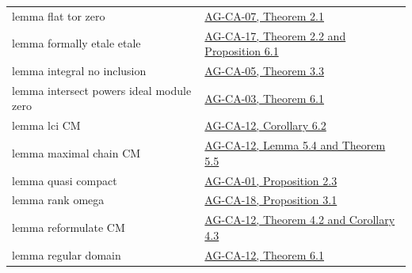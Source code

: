 \documentclass[11pt,a4paper,openany]{report}
\begin{document}
{\begin{longtable}[]{@{}
  >{\raggedright\arraybackslash}p{}
  >{\raggedright\arraybackslash}p{}@{}}
lemma flat tor zero & \href{https://github.com/KokunoYumeto/open-math-courses/blob/d02d0a3669f42579db037cd44de1d113fdd770a1/docs/courses/AG-CA/src/tor-and-flat-modules.md}{AG-CA-07, Theorem 2.1} \\
lemma formally etale etale & \href{https://github.com/KokunoYumeto/open-math-courses/blob/d02d0a3669f42579db037cd44de1d113fdd770a1/docs/courses/AG-CA/src/formally-smooth-unramified-and-etale-ring-maps.md}{AG-CA-17, Theorem 2.2 and Proposition 6.1} \\
lemma integral no inclusion & \href{https://github.com/KokunoYumeto/open-math-courses/blob/d02d0a3669f42579db037cd44de1d113fdd770a1/docs/courses/AG-CA/src/integral-extensions-lying-over-going-up-and-going-down.md}{AG-CA-05, Theorem 3.3} \\
lemma intersect powers ideal module zero & \href{https://github.com/KokunoYumeto/open-math-courses/blob/d02d0a3669f42579db037cd44de1d113fdd770a1/docs/courses/AG-CA/src/noetherian-and-artinian-rings.md}{AG-CA-03, Theorem 6.1} \\
lemma lci CM & \href{https://github.com/KokunoYumeto/open-math-courses/blob/d02d0a3669f42579db037cd44de1d113fdd770a1/docs/courses/AG-CA/src/regular-sequences-depth-and-cohen-macaulay-modules.md}{AG-CA-12, Corollary 6.2} \\
lemma maximal chain CM & \href{https://github.com/KokunoYumeto/open-math-courses/blob/d02d0a3669f42579db037cd44de1d113fdd770a1/docs/courses/AG-CA/src/regular-sequences-depth-and-cohen-macaulay-modules.md}{AG-CA-12, Lemma 5.4 and Theorem 5.5} \\
lemma quasi compact & \href{https://github.com/KokunoYumeto/open-math-courses/blob/d02d0a3669f42579db037cd44de1d113fdd770a1/docs/courses/AG-CA/src/spectra-of-rings.md}{AG-CA-01, Proposition 2.3} \\
lemma rank omega & \href{https://github.com/KokunoYumeto/open-math-courses/blob/d02d0a3669f42579db037cd44de1d113fdd770a1/docs/courses/AG-CA/src/smooth-algebras-over-a-field-and-the-jacobian-criterion.md}{AG-CA-18, Proposition 3.1} \\
lemma reformulate CM & \href{https://github.com/KokunoYumeto/open-math-courses/blob/d02d0a3669f42579db037cd44de1d113fdd770a1/docs/courses/AG-CA/src/regular-sequences-depth-and-cohen-macaulay-modules.md}{AG-CA-12, Theorem 4.2 and Corollary 4.3} \\
lemma regular domain & \href{https://github.com/KokunoYumeto/open-math-courses/blob/d02d0a3669f42579db037cd44de1d113fdd770a1/docs/courses/AG-CA/src/regular-sequences-depth-and-cohen-macaulay-modules.md}{AG-CA-12, Theorem 6.1} \\

\end{longtable}}
\end{document}
